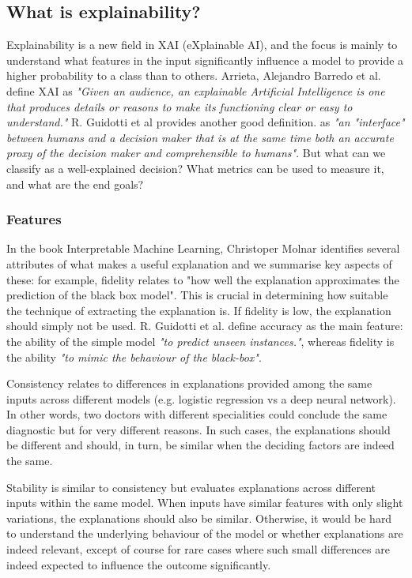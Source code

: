 \documentclass[proposal]{softeng}
\begin{document}
\subsection{What is explainability?}
Explainability is a new field in XAI (eXplainable AI), and the focus is mainly to understand what features in the input significantly influence a model to provide a higher probability to a class than to others. Arrieta, Alejandro Barredo et al. \cite{BarredoArrietaAlejandro2020EAIX} define XAI as \textit{"Given an audience, an explainable Artificial Intelligence is one that produces details or reasons to make its functioning clear or easy to understand."} R. Guidotti et al provides another good definition. \cite{guidotti} as \textit{"an "interface" between humans and a decision maker that is at the same time both an accurate proxy of the decision maker and comprehensible to humans"}. But what can we classify as a well-explained decision? What metrics can be used to measure it, and what are the end goals?

\subsubsection{Features}
In the book Interpretable Machine Learning, Christoper Molnar \cite{molnar2019} identifies several attributes of what makes a useful explanation and we summarise key aspects of these: for example, fidelity relates to "how well the explanation approximates the prediction of the black box model". This is crucial in determining how suitable the technique of extracting the explanation is. If fidelity is low, the explanation should simply not be used. R. Guidotti et al. \cite{guidotti} define accuracy as the main feature: the ability of the simple model \textit{"to predict unseen instances."}, whereas fidelity is the ability \textit{"to mimic the behaviour of the black-box"}.

Consistency relates to differences in explanations provided among the same inputs across different models (e.g. logistic regression vs a deep neural network). In other words, two doctors with different specialities could conclude the same diagnostic but for very different reasons. In such cases, the explanations should be different and should, in turn, be similar when the deciding factors are indeed the same.

Stability is similar to consistency but evaluates explanations across different inputs within the same model. When inputs have similar features with only slight variations, the explanations should also be similar. Otherwise, it would be hard to understand the underlying behaviour of the model or whether explanations are indeed relevant, except of course for rare cases where such small differences are indeed expected to influence the outcome significantly.
\end{document}
